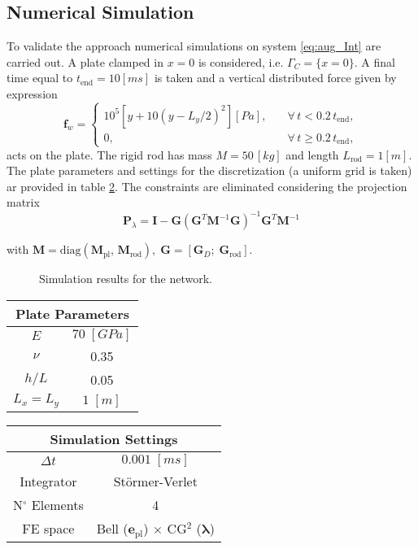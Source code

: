 \documentclass[letterpaper, 10 pt, conference]{ieeeconf}
\begin{document}
\subsection{Numerical Simulation}
To validate the approach numerical simulations on system \eqref{eq:aug_Int} are carried out. A  plate clamped in $x=0$ is considered, i.e. $\Gamma_C = \{x = 0\}$. A final time equal to $t_{\text{end}} = 10 [ms]$ is taken and a vertical distributed force given by expression
\[
\bm{f}_w = \begin{cases}
10^5 \left[ y + 10 \left( y - L_y/2 \right)^2 \right] [Pa], \quad &\forall \, t < 0.2 \, t_{\text{end}}, \\
0, \quad &\forall \, t \ge 0.2 \, t_{\text{end}},
\end{cases}
\]
acts on the plate. The rigid rod has mass $M = 50 \, [kg]$ and length $L_{\text{rod}} = 1 [m]$. The plate parameters and settings for the discretization (a uniform grid is taken) ar provided in table \ref{tab:par}. The constraints are eliminated considering the projection matrix
\begin{equation} \label{eq:proj}
\bm{P}_{\lambda} = \bm{I} - \bm{G} \left(\bm{G}^T \bm{M}^{-1} \bm{G} \right)^{-1} \bm{G}^T \bm{M}^{-1}
\end{equation}
 
with $\bm{M} = \text{diag}(\bm{M}_{\text{pl}}, \, \bm{M}_{\text{rod}}), \; \bm{G} = [\bm{G}_D; \; \bm{G}_{\text{rod}}]$.

\begin{figure}[t]
\centering
{}
\hfil
{}
\caption{Simulation results for the network.}
\label{fig:HamInt}
\end{figure}

\begin{table}[t]
	\centering
	\begin{tabular}{|c|c|}
		\hline 
		\multicolumn{2}{|c|}{Plate Parameters} \\ 
		\hline 
		$E$ & $70\; [GPa]$ \\ 
		$\nu$& 0.35 \\ 
		$h/L$& 0.05 \\ 
		$L_x = L_y$& $1\; [m]$\\ 
		\hline 
	\end{tabular} 
	\begin{tabular}{|c|c|}
		\hline 
		\multicolumn{2}{|c|}{Simulation Settings} \\ 
		\hline 
		$\Delta t $ & $0.001 \; [ms]$ \\ 
		Integrator & St\"ormer-Verlet \\ 
		N$^\circ$ Elements & 4 \\
		FE space & Bell ($\bm{e}_{\text{pl}}$) $\times$ CG$^2$ ($\bm{\lambda}$)\\
		\hline 
	\end{tabular} 
	\captionsetup{width=0.95\linewidth}
	\vspace{1mm}
	\label{tab:par}
\end{table}
\end{document}

